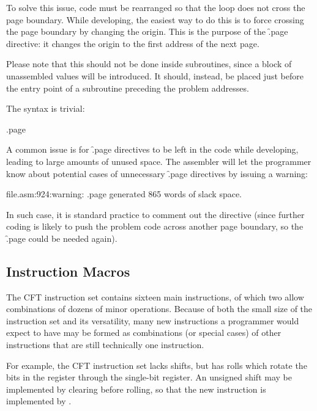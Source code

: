To solve this issue, code must be rearranged so that the loop does not cross
the page boundary. While developing, the easiest way to do this is to force
crossing the page boundary by changing the origin. This is the purpose of the
\f{.page} directive: it changes the origin to the first address of the next
page.

Please note that this should not be done inside subroutines, since a block of
unassembled values will be introduced. It should, instead, be placed just
before the entry point of a subroutine preceding the problem addresses.

The syntax is trivial:

\begin{cftasmcode}
.page
\end{cftasmcode}

A common issue is for \f{.page} directives to be left in the code while
developing, leading to large amounts of unused space. The assembler will let
the programmer know about potential cases of unnecessary \f{.page} directives
by issuing a warning:

\begin{intrcode}
file.asm:924:warning: .page generated 865 words of slack space.
\end{intrcode}

In such case, it is standard practice to comment out the directive (since
further coding is likely to push the problem code across another page boundary,
so the \f{.page} could be needed again).



\subsection{Instruction Macros}

The CFT instruction set contains sixteen main instructions, of which two allow
combinations of dozens of minor operations. Because of both the small size of
the instruction set and its versatility, many new instructions a programmer
would expect to have may be formed as combinations (or special cases) of other
instructions that are still technically one instruction.

For example, the CFT instruction set lacks shifts, but has rolls which rotate
the bits in the \AC{} register through the single-bit \Lreg{} register. An
unsigned shift may be implemented by clearing \Lreg{} before rolling, so that
the new instruction  is implemented by .

